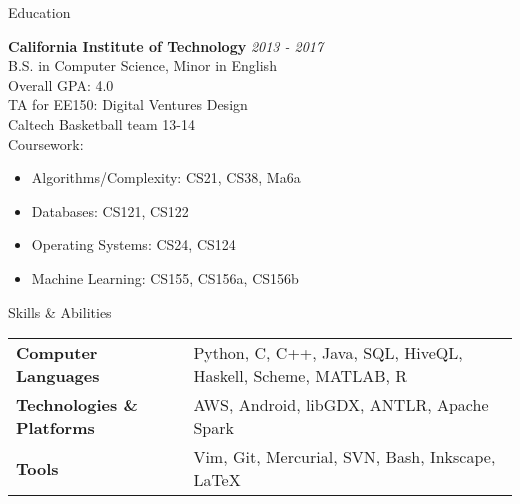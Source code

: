 \documentclass{resume} %
\begin{document}

\begin{rSection}{Education}

{\bf California Institute of Technology} \hfill {\em 2013 - 2017} \\
B.S. in Computer Science, Minor in English \\ 
Overall GPA: 4.0 \smallskip \\
TA for EE150: Digital Ventures Design \\
Caltech Basketball team 13-14 \smallskip \\
Coursework:
\vspace{-5.0mm}
\begin{minipage}{0.43\linewidth}
\begin{itemize}
    \item{Algorithms/Complexity: CS21, CS38, Ma6a}
    \item{Databases: CS121, CS122}
\end{itemize}
\end{minipage}
\begin{minipage}{0.43\linewidth}
\begin{itemize}
    \item{Operating Systems: CS24, CS124}
    \item{Machine Learning: CS155, CS156a, CS156b}
\end{itemize}
\end{minipage}
\vspace{5mm}
\end{rSection}


\begin{rSection}{Skills \& Abilities}

\begin{tabularx}{\textwidth}{@{}lX}
    \bfseries{Computer Languages}   &  Python, C, C++, Java, SQL, HiveQL, Haskell, Scheme, MATLAB, R \\
    \bfseries{Technologies \& Platforms}   &   AWS, Android, libGDX, ANTLR, Apache Spark \\
    \bfseries{Tools}   &  Vim, Git, Mercurial, SVN, Bash, Inkscape, \LaTeX \\
\end{tabularx}

\end{rSection}
\end{document}

